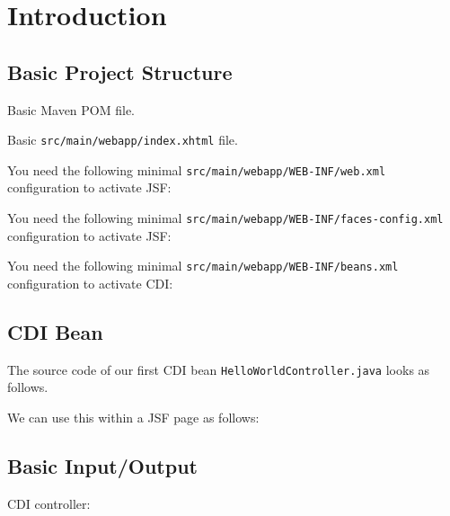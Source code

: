 %

\chapter{Introduction}

\section{Basic Project Structure}
Basic Maven POM file.


Basic \texttt{src/main/webapp/index.xhtml} file.


You need the following minimal \texttt{src/main/webapp/WEB-INF/web.xml} configuration to activate JSF:


You need the following minimal \texttt{src/main/webapp/WEB-INF/faces-config.xml} configuration to activate JSF:


You need the following minimal \texttt{src/main/webapp/WEB-INF/beans.xml} configuration to activate CDI:


\section{CDI Bean}

The source code of our first CDI bean \texttt{HelloWorldController.java} looks as follows.


We can use this within a JSF page as follows:


\section{Basic Input/Output}

CDI controller:


